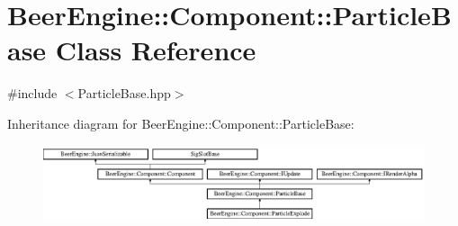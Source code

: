 \hypertarget{class_beer_engine_1_1_component_1_1_particle_base}{}\section{Beer\+Engine\+:\+:Component\+:\+:Particle\+Base Class Reference}
\label{class_beer_engine_1_1_component_1_1_particle_base}


{\ttfamily \#include $<$Particle\+Base.\+hpp$>$}

Inheritance diagram for Beer\+Engine\+:\+:Component\+:\+:Particle\+Base\+:\begin{figure}[H]
\begin{center}
\leavevmode
\includegraphics[height=2.248996cm]{class_beer_engine_1_1_component_1_1_particle_base}
\end{center}
\end{figure}
